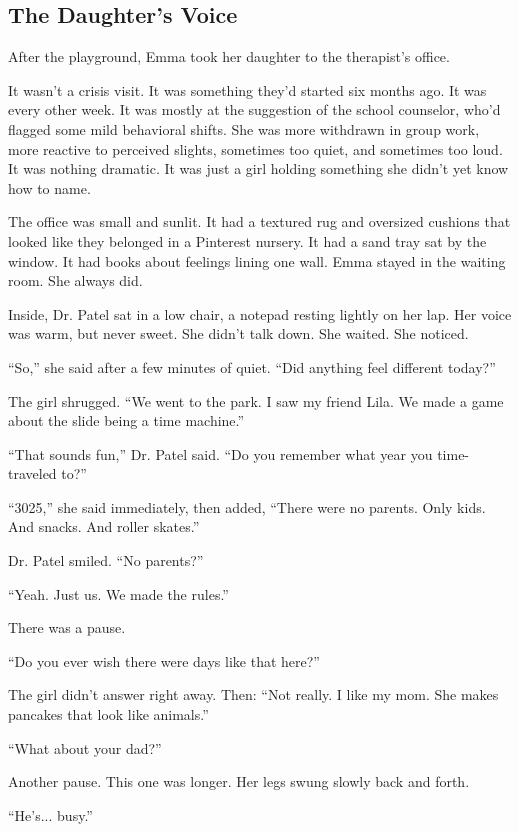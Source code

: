 \subsection{The Daughter’s Voice}

After the playground, Emma took her daughter to the therapist’s office.

It wasn’t a crisis visit. 
It was something they’d started six months ago. 
It was every other week. 
It was mostly at the suggestion of the school counselor, who’d flagged some mild behavioral shifts.
She was more withdrawn in group work, more reactive to perceived slights, sometimes too quiet, and sometimes too loud. 
It was nothing dramatic. 
It was just a girl holding something she didn’t yet know how to name.

The office was small and sunlit. 
It had a textured rug and oversized cushions that looked like they belonged in a Pinterest nursery. 
It had a sand tray sat by the window. 
It had books about feelings lining one wall. 
Emma stayed in the waiting room. 
She always did.

Inside, Dr. Patel sat in a low chair, a notepad resting lightly on her lap. 
Her voice was warm, but never sweet. 
She didn’t talk down. 
She waited. 
She noticed.

``So,'' she said after a few minutes of quiet. ``Did anything feel different today?''

The girl shrugged. ``We went to the park. I saw my friend Lila. We made a game about the slide being a time machine.''

``That sounds fun,'' Dr. Patel said. ``Do you remember what year you time-traveled to?''

``3025,'' she said immediately, then added, ``There were no parents. Only kids. And snacks. And roller skates.''

Dr. Patel smiled. ``No parents?''

``Yeah. Just us. We made the rules.''

There was a pause.

``Do you ever wish there were days like that here?''

The girl didn’t answer right away. Then: ``Not really. I like my mom. She makes pancakes that look like animals.''

``What about your dad?''

Another pause. 
This one was longer. 
Her legs swung slowly back and forth.

``He’s... busy.''

